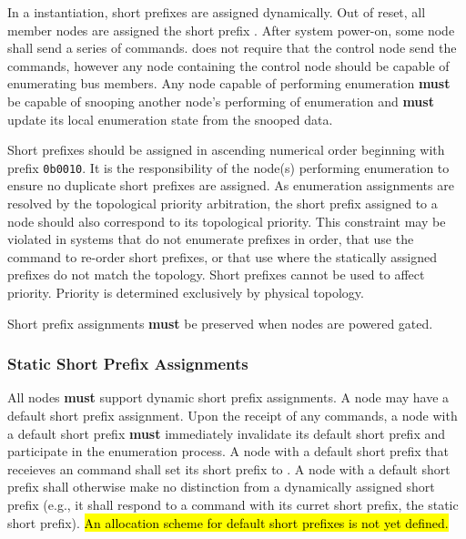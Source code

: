 In a \bus instantiation, short prefixes are assigned dynamically. Out of
reset, all member nodes are assigned the short prefix
. After system power-on, some node
shall send a series of  commands. \bus does not
require that the control node send the  commands,
however any node containing the control node should be capable of enumerating
bus members. Any node capable of performing enumeration {\bf must} be capable
of snooping another node's performing of enumeration and {\bf must} update its
local enumeration state from the snooped data.

Short prefixes should be assigned in ascending numerical order beginning with
prefix {\tt 0b0010}.
It is the responsibility of the
node(s) performing enumeration to ensure no duplicate short prefixes are
assigned.
As enumeration assignments are resolved by the
topological priority arbitration, the short prefix assigned to a node should
also correspond to its topological priority.
This constraint may be violated in systems that do not enumerate prefixes in
order, that use the
 command to re-order short prefixes, or
that use  where the statically
assigned prefixes do not match the topology. Short prefixes cannot be used to
affect priority. Priority is determined exclusively by physical topology.

Short prefix assignments {\bf must} be preserved when nodes are powered gated.

\subsubsection{Static Short Prefix Assignments}
\label{sec:addressing-static-short-prefix}
All \bus nodes {\bf must} support dynamic short prefix assignments. A node may
have a default short prefix assignment. Upon the receipt of any
 commands, a node with a default short prefix {\bf
must} immediately invalidate its default short prefix and participate in the
enumeration process. A node with a default short prefix that receieves an
 command shall set its short prefix to
. A node with a default short prefix
shall otherwise make no distinction from a dynamically assigned short prefix
(e.g., it shall respond to a  command with its
curret short prefix, the static short prefix).
\hl{An allocation scheme for default short prefixes is not yet defined.}

